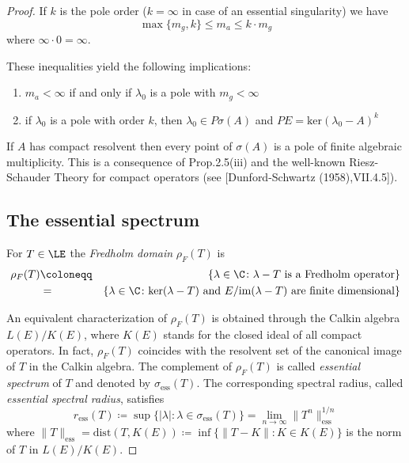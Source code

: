 \begin{proof}
If $k$ is the pole order ($k = \infty$ in case of an essential singularity) we have
\begin{equation}\label{eq:a3-3.4}
\max\{m_{g},k\} \leq m_{a} \leq k \cdot m_{g}
\end{equation}
where $\infty \cdot 0 = \infty$.

These inequalities yield the following implications:
\begin{enumerate}[-]
\item  
$m_{a} < \infty$ if and only if $\lambda_{0}$ is a pole with $m_{g} < \infty$
\item 
if $\lambda_{0}$ is a pole with order $k$, then $\lambda_{0} \in P\sigma(A)$ and $PE = \text{ker}(\lambda_{0} - A)^{k}$
\end{enumerate}

If $A$ has compact resolvent then every point of $\sigma(A)$ is a pole of finite algebraic multiplicity.
This is a consequence of Prop.2.5(iii) and the well-known Riesz-Schauder Theory for compact operators (see [Dunford-Schwartz (1958),VII.4.5]).

\subsection{The essential spectrum}\label{subsec:a3-3.7}

For $T \in \LE$ the \emph{Fredholm domain} $\rho_{F}(T)$ is
\begin{align*}\label{eq:a3-3.5}
\rho_{F}(T) & \coloneqq & \{\lambda \in \C \colon \lambda - T \text{ is a Fredholm operator}\}\\
& = & \{\lambda \in \C \colon \text{ker}(\lambda - T) \text{ and } E/\text{im}(\lambda - T) \text{ are finite dimensional}\}
\end{align*}

An equivalent characterization of $\rho_{F}(T)$ is obtained through the Calkin algebra $L(E)/K(E)$, where $K(E)$ stands for the closed ideal of all compact operators.
In fact, $\rho_{F}(T)$ coincides with the resolvent set of the canonical image of $T$ in the Calkin algebra.
The complement of $\rho_{F}(T)$ is called \emph{essential spectrum} of $T$ and denoted by $\sigma_{\text{ess}}(T)$.
The corresponding spectral radius, called \emph{essential spectral radius}, satisfies
\begin{equation}\label{eq:a3-3.6}
r_{\text{ess}}(T) \coloneqq \sup \{|\lambda| \colon \lambda \in \sigma_{\text{ess}}(T)\} = \lim_{n \to \infty} \|T^{n}\|_{\text{ess}}^{1/n}
\end{equation}
where $\|T\|_{\text{ess}} = \text{dist}(T,K(E)) \coloneqq \inf \{\|T - K\| \colon K \in K(E)\}$ is the norm of $T$ in $L(E)/K(E)$.


\end{proof}
